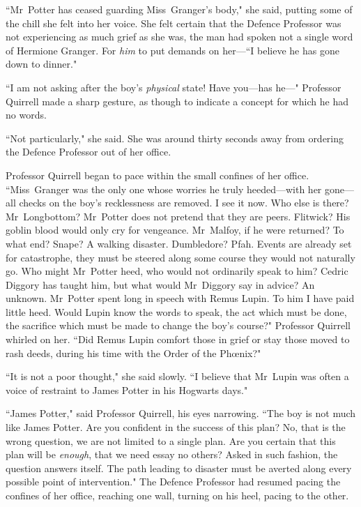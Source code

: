``Mr~Potter has ceased guarding Miss~Granger's body," she said, putting some of the chill she felt into her voice. She felt certain that the Defence Professor was not experiencing as much grief as she was, the man had spoken not a single word of Hermione Granger. For \emph{him} to put demands on her—``I believe he has gone down to dinner."

``I am not asking after the boy's \emph{physical} state! Have you—has he—" Professor Quirrell made a sharp gesture, as though to indicate a concept for which he had no words.

``Not particularly," she said. She was around thirty seconds away from ordering the Defence Professor out of her office.

Professor Quirrell began to pace within the small confines of her office. ``Miss~Granger was the only one whose worries he truly heeded—with her gone—all checks on the boy's recklessness are removed. I see it now. Who else is there? Mr~Longbottom? Mr~Potter does not pretend that they are peers. Flitwick? His goblin blood would only cry for vengeance. Mr~Malfoy, if he were returned? To what end? Snape? A walking disaster. Dumbledore? Pfah. Events are already set for catastrophe, they must be steered along some course they would not naturally go. Who might Mr~Potter heed, who would not ordinarily speak to him? Cedric Diggory has taught him, but what would Mr~Diggory say in advice? An unknown. Mr~Potter spent long in speech with Remus Lupin. To him I have paid little heed. Would Lupin know the words to speak, the act which must be done, the sacrifice which must be made to change the boy's course?" Professor Quirrell whirled on her. ``Did Remus Lupin comfort those in grief or stay those moved to rash deeds, during his time with the Order of the Phœnix?"

``It is not a poor thought," she said slowly. ``I believe that Mr~Lupin was often a voice of restraint to James Potter in his Hogwarts days."

``James Potter," said Professor Quirrell, his eyes narrowing. ``The boy is not much like James Potter. Are you confident in the success of this plan? No, that is the wrong question, we are not limited to a single plan. Are you certain that this plan will be \emph{enough}, that we need essay no others? Asked in such fashion, the question answers itself. The path leading to disaster must be averted along every possible point of intervention." The Defence Professor had resumed pacing the confines of her office, reaching one wall, turning on his heel, pacing to the other.

